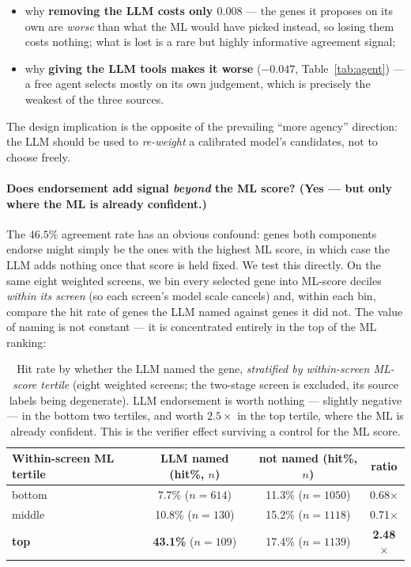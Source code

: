 \documentclass[11pt]{article}
\newcommand{\best}[1]{\textbf{#1}}
\begin{document}
\begin{itemize}\itemsep2pt
  \item why \textbf{removing the LLM costs only $0.008$} --- the genes it proposes on its own are
        \emph{worse} than what the ML would have picked instead, so losing them costs nothing; what is
        lost is a rare but highly informative agreement signal;
  \item why \textbf{giving the LLM tools makes it worse} ($-0.047$, Table~\ref{tab:agent}) --- a free
        agent selects mostly on its own judgement, which is precisely the weakest of the three sources.
\end{itemize}

\noindent
The design implication is the opposite of the prevailing ``more agency'' direction: the LLM should
be used to \emph{re-weight} a calibrated model's candidates, not to choose freely.

\paragraph{Does endorsement add signal \emph{beyond} the ML score? (Yes --- but only where the ML is
already confident.)} The $46.5\%$ agreement rate has an obvious confound: genes both components endorse
might simply be the ones with the highest ML score, in which case the LLM adds nothing once that score
is held fixed. We test this directly. On the same eight weighted screens, we bin every selected gene
into ML-score deciles \emph{within its screen} (so each screen's model scale cancels) and, within each
bin, compare the hit rate of genes the LLM named against genes it did not. The value of naming is not
constant --- it is concentrated entirely in the top of the ML ranking:

\begin{table}[H]
\centering
\caption{Hit rate by whether the LLM named the gene, \emph{stratified by within-screen ML-score
tertile} (eight weighted screens; the two-stage screen is excluded, its source labels being degenerate).
LLM endorsement is worth nothing --- slightly negative --- in the bottom two tertiles, and worth
$2.5\times$ in the top tertile, where the ML is already confident. This is the verifier effect
surviving a control for the ML score.}
\label{tab:cond_attrib}
\setlength{\tabcolsep}{8pt}
\begin{tabular}{lccc}
\toprule
Within-screen ML tertile & LLM named (hit\%, $n$) & not named (hit\%, $n$) & ratio \\
\midrule
bottom & 7.7\% \;($n{=}614$)  & 11.3\% \;($n{=}1050$) & 0.68$\times$ \\
middle & 10.8\% \;($n{=}130$) & 15.2\% \;($n{=}1118$) & 0.71$\times$ \\
\textbf{top} & \best{43.1\%} \;($n{=}109$) & 17.4\% \;($n{=}1139$) & \textbf{2.48$\times$} \\
\bottomrule
\end{tabular}
\end{table}
\end{document}
